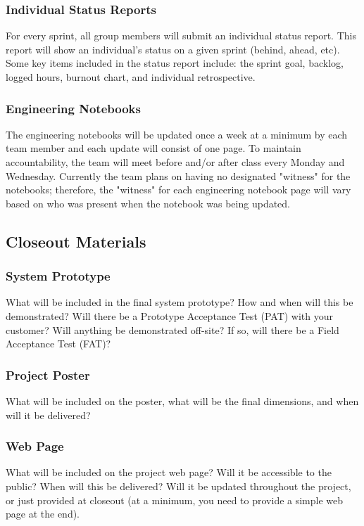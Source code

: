 \subsubsection{Individual Status Reports}
For every sprint, all group members will submit an individual status report. This report will show an individual's status on a given sprint (behind, ahead, etc). Some key items included in the status report include: the sprint goal, backlog, logged hours, burnout chart, and individual retrospective.

\subsubsection{Engineering Notebooks}
The engineering notebooks will be updated once a week at a minimum by each team member and each update will consist of one page. To maintain accountability, the team will meet before and/or after class every Monday and Wednesday. Currently the team plans on having no designated "witness" for the notebooks; therefore, the "witness" for each engineering notebook page will vary based on who was present when the notebook was being updated.

\subsection{Closeout Materials}

\subsubsection{System Prototype}
What will be included in the final system prototype? How and when will this be demonstrated? Will there be a Prototype Acceptance Test (PAT) with your customer? Will anything be demonstrated off-site? If so, will there be a Field Acceptance Test (FAT)?

\subsubsection{Project Poster}
What will be included on the poster, what will be the final dimensions, and when will it be delivered?

\subsubsection{Web Page}
What will be included on the project web page? Will it be accessible to the public? When will this be delivered? Will it be updated throughout the project, or just provided at closeout (at a minimum, you need to provide a simple web page at the end).

